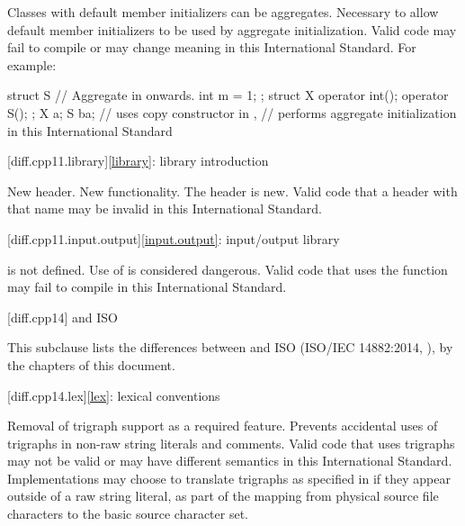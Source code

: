 \change Classes with default member initializers can be aggregates.
\rationale Necessary to allow default member initializers to be used
by aggregate initialization.
\effect
Valid \CppXI{} code may fail to compile or may change meaning in this International Standard.
For example:
\begin{codeblock}
struct S { // Aggregate in \CppXIV{} onwards.
  int m = 1;
};
struct X {
  operator int();
  operator S();
};
X a{};
S b{a};  // uses copy constructor in \CppXI{},
         // performs aggregate initialization in this International Standard
\end{codeblock}

[diff.cpp11.library]{\ref{library}: library introduction}

\change New header.
\rationale New functionality.
\effect
The \Cpp{} header  is new.
Valid \CppXI{} code that  a header with that name may be
invalid in this International Standard.

[diff.cpp11.input.output]{\ref{input.output}: input/output library}

\change {} is not defined.
\rationale Use of  is considered dangerous.
\effect
Valid \CppXI{} code that uses the  function may fail to compile
in this International Standard.

[diff.cpp14]{\Cpp{} and ISO \CppXIV{}}

\pnum
{}%
This subclause lists the differences between \Cpp{} and
ISO \CppXIV{} (ISO/IEC 14882:2014, ),
by the chapters of this document.

[diff.cpp14.lex]{\ref{lex}: lexical conventions}

%
\change Removal of trigraph support as a required feature.
\rationale Prevents accidental uses of trigraphs in non-raw string literals and comments.
\effect
Valid \CppXIV{} code that uses trigraphs may not be valid or may have different
semantics in this International Standard. Implementations may choose to
translate trigraphs as specified in \CppXIV{} if they appear outside of a raw
string literal, as part of the  mapping from physical source file characters to
the basic source character set.

